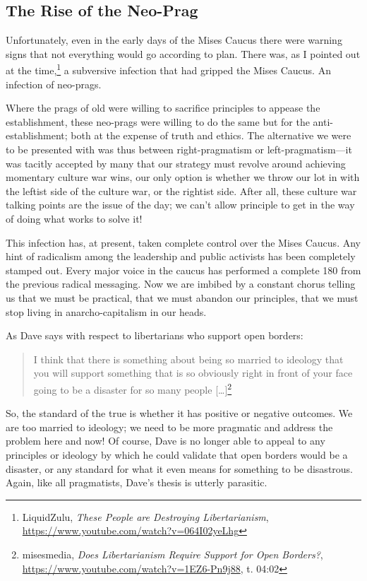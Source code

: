 \documentclass[11pt]{article}
\begin{document}
\subsection{The Rise of the Neo-Prag}
\label{sec:org925ec24}
Unfortunately, even in the early days of the Mises Caucus there were warning signs that not everything would go according to plan. There was, as I pointed out at the time,\footnote{LiquidZulu, \emph{These People are Destroying Libertarianism}, \url{https://www.youtube.com/watch?v=064I02yeLhg}} a subversive infection that had gripped the Mises Caucus. An infection of neo-prags.

Where the prags of old were willing to sacrifice principles to appease the establishment, these neo-prags were willing to do the same but for the anti-establishment; both at the expense of truth and ethics. The alternative we were to be presented with was thus between right-pragmatism or left-pragmatism---it was tacitly accepted by many that our strategy must revolve around achieving momentary culture war wins, our only option is whether we throw our lot in with the leftist side of the culture war, or the rightist side. After all, these culture war talking points are the issue of the day; we can't allow principle to get in the way of doing what works to solve it!

This infection has, at present, taken complete control over the Mises Caucus. Any hint of radicalism among the leadership and public activists has been completely stamped out. Every major voice in the caucus has performed a complete 180 from the previous radical messaging. Now we are imbibed by a constant chorus telling us that we must be practical, that we must abandon our principles, that we must stop living in anarcho-capitalism in our heads.

As Dave says with respect to libertarians who support open borders:
\begin{quote}
I think that there is something about being so married to ideology that you will support something that is so obviously right in front of your face going to be a disaster for so many people [\ldots{}]\footnote{misesmedia, \emph{Does Libertarianism Require Support for Open Borders?}, \url{https://www.youtube.com/watch?v=1EZ6-Pn9j88}, t. 04:02}
\end{quote}

So, the standard of the true is whether it has positive or negative outcomes. We are too married to ideology; we need to be more pragmatic and address the problem here and now! Of course, Dave is no longer able to appeal to any principles or ideology by which he could validate that open borders would be a disaster, or any standard for what it even means for something to be disastrous. Again, like all pragmatists, Dave's thesis is utterly parasitic.
\end{document}
